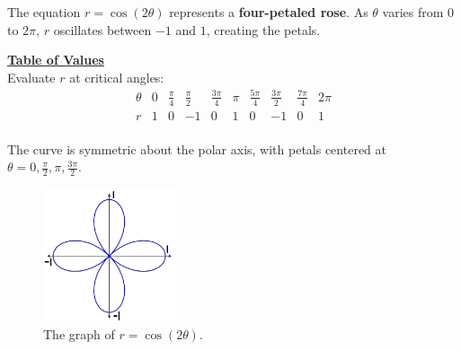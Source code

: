 \documentclass{article}
\begin{document}
\begin{solutionbox}
The equation \( r = \cos(2\theta) \) represents a \textbf{four-petaled rose}. As \( \theta \) varies from \( 0 \) to \( 2\pi \), \( r \) oscillates between \( -1 \) and \( 1 \), creating the petals.

\begin{conceptbox}
    \textbf{\underline{Table of Values}} \\ 
    Evaluate \( r \) at critical angles:
    \[
    \begin{array}{c|ccccccccc}
    \theta & 0 & \frac{\pi}{4} & \frac{\pi}{2} & \frac{3\pi}{4} & \pi & \frac{5\pi}{4} & \frac{3\pi}{2} & \frac{7\pi}{4} & 2\pi \\
    \hline
    r & 1 & 0 & -1 & 0 & 1 & 0 & -1 & 0 & 1 \\
    \end{array}
    \]
    
    The curve is symmetric about the polar axis, with petals centered at \( \theta = 0, \frac{\pi}{2}, \pi, \frac{3\pi}{2} \).
\end{conceptbox}

\begin{figure}[H]
    \centering
    \includegraphics[width=0.35\textwidth]{polar curve sketch e.png}
    \caption{The graph of \( r = \cos(2\theta) \).}
    \label{fig:rose_graph}
\end{figure}
\end{solutionbox}
\end{document}
